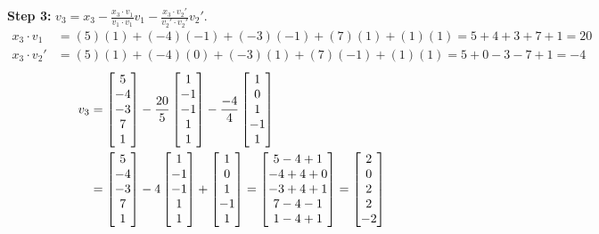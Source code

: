 \documentclass[11pt, letterpaper]{article}
\theoremstyle{definition}
\theoremstyle{remark}
\begin{document}
\textbf{Step 3:} $v_3 = x_3 - \frac{x_3 \cdot v_1}{v_1 \cdot v_1}v_1 - \frac{x_3 \cdot v_2'}{v_2' \cdot v_2'}v_2'$.
\begin{align*}
    x_3 \cdot v_1 &= (5)(1) + (-4)(-1) + (-3)(-1) + (7)(1) + (1)(1) = 5 + 4 + 3 + 7 + 1 = 20 \\
    x_3 \cdot v_2' &= (5)(1) + (-4)(0) + (-3)(1) + (7)(-1) + (1)(1) = 5 + 0 - 3 - 7 + 1 = -4
\end{align*}
\begin{align*}
    v_3 &= \begin{bmatrix} 5 \\ -4 \\ -3 \\ 7 \\ 1 \end{bmatrix} - \frac{20}{5} \begin{bmatrix} 1 \\ -1 \\ -1 \\ 1 \\ 1 \end{bmatrix} - \frac{-4}{4} \begin{bmatrix} 1 \\ 0 \\ 1 \\ -1 \\ 1 \end{bmatrix} \\ \relax
    &= \begin{bmatrix} 5 \\ -4 \\ -3 \\ 7 \\ 1 \end{bmatrix} - 4 \begin{bmatrix} 1 \\ -1 \\ -1 \\ 1 \\ 1 \end{bmatrix} + \begin{bmatrix} 1 \\ 0 \\ 1 \\ -1 \\ 1 \end{bmatrix} = \begin{bmatrix} 5 - 4 + 1 \\ -4 + 4 + 0 \\ -3 + 4 + 1 \\ 7 - 4 - 1 \\ 1 - 4 + 1 \end{bmatrix} = \begin{bmatrix} 2 \\ 0 \\ 2 \\ 2 \\ -2 \end{bmatrix}
\end{align*}
\end{document}
